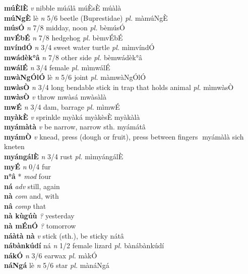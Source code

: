 \documentclass{article}
\begin{document}
{\bf múÈlÈ}  {\it v} nibble   múálâ  múÈsÈ múàlà   \\ 
{\bf múNgÈ} lè {\it n} 5/6 beetle (Buprestidae) {\it pl.} màmúNgÈ         \\ 
{\bf músÓ}  {\it n} 7/8 midday, noon {\it pl.} bèmúsÓ         \\ 
{\bf mvÉbÉ}  {\it n} 7/8 hedgehog {\it pl.} bèmvÉbÉ         \\ 
{\bf mvíndÓ}  {\it n} 3/4 sweet water turtle {\it pl.} mìmvíndÓ         \\ 
{\bf mwádèk°â}  {\it n} 7/8 other side {\it pl.} bèmwádèk°â         \\ 
{\bf mwálÉ}  {\it n} 3/4 female {\it pl.} mìmwálÉ         \\ 
{\bf mwàNgÓlÓ} lè {\it n} 5/6 joint {\it pl.} màmwàNgÓlÓ         \\ 
{\bf mwàsÒ}  {\it n} 3/4 long bendable stick in trap that holds animal {\it pl.} mìmwàsÒ         \\ 
{\bf mwàsÒ}  {\it v} throw   mwàsá   mwàsàlà   \\ 
{\bf mwÉ}  {\it n} 3/4 dam, barrage {\it pl.} mìmwÉ         \\ 
{\bf myàkÈ}  {\it v} sprinkle   myàká  myàkèsÈ myàkàlà   \\ 
{\bf myámàtà}  {\it v} be narrow, narrow sth.   myámátâ      \\ 
{\bf myámÒ}  {\it v} knead, press (dough or fruit), press between fingers      myámàlà sich kneten   \\ 
{\bf myángálÈ}  {\it n} 3/4 rust {\it pl.} mìmyángálÈ         \\ 
{\bf myÉ}  {\it n} 0/4 fur         \\ 
{\bf n°â} * {\it mod} four         \\ 
{\bf ná}  {\it adv} still, again         \\ 
{\bf nà}  {\it com} and, with         \\ 
{\bf nâ}  {\it comp} that         \\ 
{\bf nà kùgúù}  {\it ?} yesterday         \\ 
{\bf nà mÉnÓ}  {\it ?} tomorrow         \\ 
{\bf náàtà nà}  {\it v} stick (sth.), be sticky   nátâ      \\ 
{\bf nábànkúdí} ná {\it n} 1/2 female lizard {\it pl.} bànábànkúdí         \\ 
{\bf nákÓ}  {\it n} 3/6 earwax {\it pl.} màkÓ         \\ 
{\bf náNgá} lè {\it n} 5/6 star {\it pl.} mànáNgá         \\ 
\end{document}

